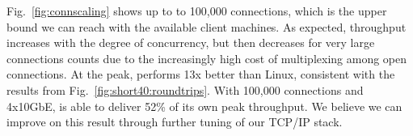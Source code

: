 
Fig.~\ref{fig:connscaling} shows up to to 100,000 connections, which
is the upper bound we can reach with the available client machines.
As expected, throughput increases with the degree of concurrency, but
then decreases for very large connections counts due to the
increasingly high cost of multiplexing among open connections.  At the
peak, \ix performs 13x better than Linux, consistent with the results
from Fig.~\ref{fig:short40:roundtrips}.  With 100,000 connections and
4x10GbE, \ix is able to deliver 52\% of its own peak
throughput.  We believe we can improve on this result
through further tuning of our TCP/IP stack. 


